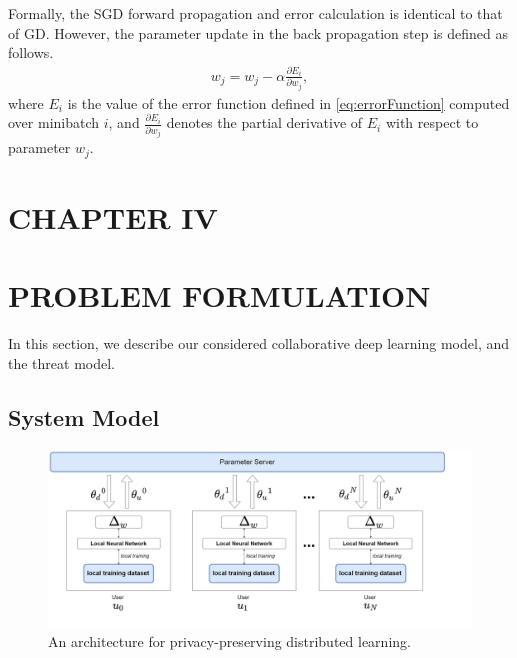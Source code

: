 \documentclass[letterpaper]{article}
\begin{document}
\begin{flushleft}
{%
Formally, the SGD forward propagation and error calculation is identical to that of GD. However, the parameter update in the 
back propagation step is defined as follows.
\begin{align}\label{eq:SGD}
w_j = w_j -\alpha \frac{\partial E_i}{\partial w_j}, 
\end{align}
where $E_i$ is the value of the error function defined in \ref{eq:errorFunction} computed over
minibatch $i$, and  $\frac{\partial E_i}{\partial w_j}$ denotes the partial derivative of $E_i$ with respect to parameter $w_j$. 

\pagebreak
\section*{CHAPTER IV}
\vspace{0.25in}
\section{PROBLEM FORMULATION}

In this section, we describe our considered collaborative deep learning model, and the threat model. 

\subsection{System Model} \label{sec:systemModel}

\begin{figure}[H]
  \centering
    \includegraphics[width=7in]{HighLevelArch.png}
    \caption[Privacy preserving architecture]{\label{fig:HighLevel} An architecture for privacy-preserving distributed learning.}
  \end{figure}

}
\end{flushleft}
\end{document}
